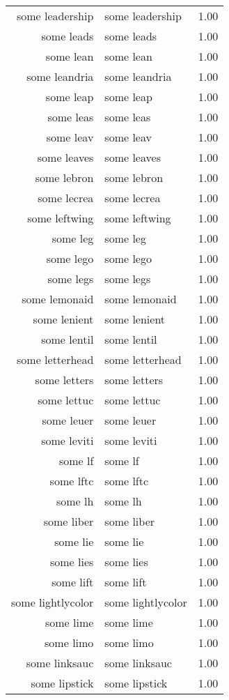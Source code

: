\begin{table}[ht]
\begin{tabular}{rlr}
  some leadership & some leadership & 1.00 \\ 
  some leads & some leads & 1.00 \\ 
  some lean & some lean & 1.00 \\ 
  some leandria & some leandria & 1.00 \\ 
  some leap & some leap & 1.00 \\ 
  some leas & some leas & 1.00 \\ 
  some leav & some leav & 1.00 \\ 
  some leaves & some leaves & 1.00 \\ 
  some lebron & some lebron & 1.00 \\ 
  some lecrea & some lecrea & 1.00 \\ 
  some leftwing & some leftwing & 1.00 \\ 
  some leg & some leg & 1.00 \\ 
  some lego & some lego & 1.00 \\ 
  some legs & some legs & 1.00 \\ 
  some lemonaid & some lemonaid & 1.00 \\ 
  some lenient & some lenient & 1.00 \\ 
  some lentil & some lentil & 1.00 \\ 
  some letterhead & some letterhead & 1.00 \\ 
  some letters & some letters & 1.00 \\ 
  some lettuc & some lettuc & 1.00 \\ 
  some leuer & some leuer & 1.00 \\ 
  some leviti & some leviti & 1.00 \\ 
  some lf & some lf & 1.00 \\ 
  some lftc & some lftc & 1.00 \\ 
  some lh & some lh & 1.00 \\ 
  some liber & some liber & 1.00 \\ 
  some lie & some lie & 1.00 \\ 
  some lies & some lies & 1.00 \\ 
  some lift & some lift & 1.00 \\ 
  some lightlycolor & some lightlycolor & 1.00 \\ 
  some lime & some lime & 1.00 \\ 
  some limo & some limo & 1.00 \\ 
  some linksauc & some linksauc & 1.00 \\ 
  some lipstick & some lipstick & 1.00 \\ 

\end{tabular}
\end{table}
